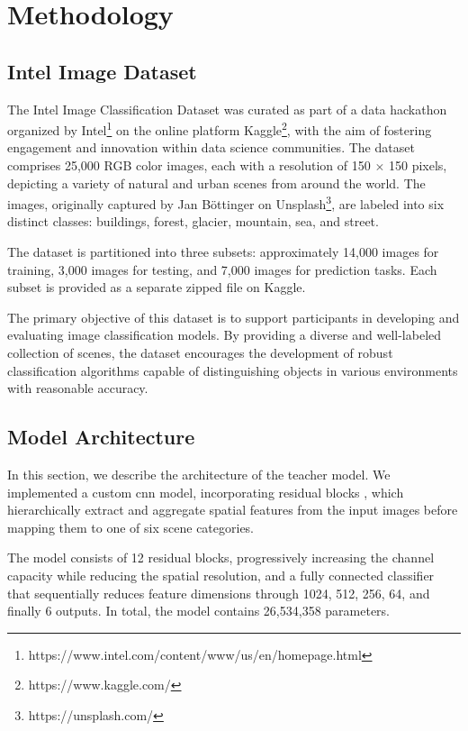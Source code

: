 \section{Methodology}

\subsection{Intel Image Dataset}

The Intel Image Classification Dataset \cite{intel_image_classification_kaggle} was curated
as part of a data hackathon organized
by Intel\footnote{https://www.intel.com/content/www/us/en/homepage.html}
on the online platform Kaggle\footnote{https://www.kaggle.com/},
with the aim of fostering engagement and innovation within data science communities.
The dataset comprises 25,000 RGB color images,
each with a resolution of 150 $\times$ 150 pixels,
depicting a variety of natural and urban scenes from around the world.
The images, originally captured by Jan Böttinger
on Unsplash\footnote{https://unsplash.com/},
are labeled into six distinct classes: buildings, forest, glacier, mountain, sea, and street.

The dataset is partitioned into three subsets: approximately 14,000 images for training,
3,000 images for testing, and 7,000 images for prediction tasks.
Each subset is provided as a separate zipped file on Kaggle.

The primary objective of this dataset is to support participants
in developing and evaluating image classification models.
By providing a diverse and well-labeled collection of scenes,
the dataset encourages the development of robust classification algorithms
capable of distinguishing objects in various environments with reasonable accuracy.

\subsection{Model Architecture}
\label{sec:method:model_architecture}

In this section, we describe the architecture of the teacher model.
We implemented a custom \gls*{cnn} model, incorporating residual blocks \cite{he2016deep},
which hierarchically extract and aggregate spatial features from the input images
before mapping them to one of six scene categories.

The model consists of 12 residual blocks,
progressively increasing the channel capacity while reducing the spatial resolution,
and a fully connected classifier that sequentially reduces feature dimensions through 1024, 512, 256, 64, and finally 6 outputs.
In total, the model contains 26,534,358 parameters.

